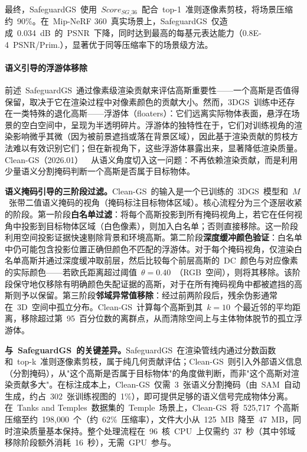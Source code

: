 最终，SafeguardGS~使用~$Score_{SG\_36}$~配合~top-1~准则逐像素剪枝，将场景压缩约~90\%。在~Mip-NeRF 360~真实场景上，SafeguardGS~仅造成~0.034~dB~的~PSNR~下降，同时达到最高的每基元表达能力（0.8E-4~PSNR/Prim.），显著优于同等压缩率下的场景级方法。

\paragraph{语义引导的浮游体移除}

前述~SafeguardGS~通过像素级渲染贡献来评估高斯重要性——一个高斯是否值得保留，取决于它在渲染过程中对像素颜色的贡献大小。然而，3DGS~训练中还存在一类特殊的退化高斯——浮游体（floaters）：它们远离实际物体表面，悬浮在场景的空白空间中，呈现为半透明碎片。浮游体的独特性在于，它们对训练视角的渲染影响微乎其微（因为被前景遮挡或落在背景区域），因此基于渲染贡献的剪枝方法难以有效识别它们；但在新视角下，这些浮游体暴露出来，显著降低渲染质量。Clean-GS（2026.01）~\cite{2601_00913}~从语义角度切入这一问题：不再依赖渲染贡献，而是利用少量语义分割掩码判断一个高斯是否属于目标物体。

\textbf{语义掩码引导的三阶段过滤。}Clean-GS~的输入是一个已训练的~3DGS~模型和~$M$~张带二值语义掩码的视角（掩码标注目标物体区域）。核心流程分为三个逐层收紧的阶段。第一阶段\textbf{白名单过滤}：将每个高斯投影到所有掩码视角上，若它在任何视角中投影到目标物体区域（白色像素），则加入白名单；否则直接移除。这一阶段利用空间投影证据快速剔除背景和环境高斯。第二阶段\textbf{深度缓冲颜色验证}：白名单中仍可能包含投影位置正确但颜色不匹配的浮游体。对于每个掩码视角，仅渲染白名单高斯并通过深度缓冲取前层，然后比较每个前层高斯的~DC~颜色与对应像素的实际颜色——若欧氏距离超过阈值~$\theta = 0.40$~（RGB~空间），则将其移除。该阶段保守地仅移除有明确颜色失配证据的高斯，对于在所有掩码视角中都被遮挡的高斯则予以保留。第三阶段\textbf{邻域异常值移除}：经过前两阶段后，残余伪影通常在~3D~空间中孤立分布。Clean-GS~计算每个高斯到其~$k = 10$~个最近邻的平均距离，移除超过第~95~百分位数的离群点，从而清除空间上与主体物体脱节的孤立浮游体。

\textbf{与~SafeguardGS~的关键差异。}SafeguardGS~在渲染管线内通过分数函数和~top-k~准则逐像素剪枝，属于纯几何贡献评估；Clean-GS~则引入外部语义信息（分割掩码），从"这个高斯是否属于目标物体"的角度做判断，而非"这个高斯对渲染贡献多大"。在标注成本上，Clean-GS~仅需~3~张语义分割掩码（由~SAM~自动生成，约占~302~张训练视图的~1\%），即可提供足够的语义信号完成物体分离。在~Tanks and Temples~数据集的~Temple~场景上，Clean-GS~将~525{,}717~个高斯压缩至约~198{,}000~个（约~62\%~压缩率），文件大小从~125~MB~降至~47~MB，同时渲染质量基本保持。整个处理流程在~96~核~CPU~上仅需约~37~秒（其中邻域移除阶段额外消耗~16~秒），无需~GPU~参与。

